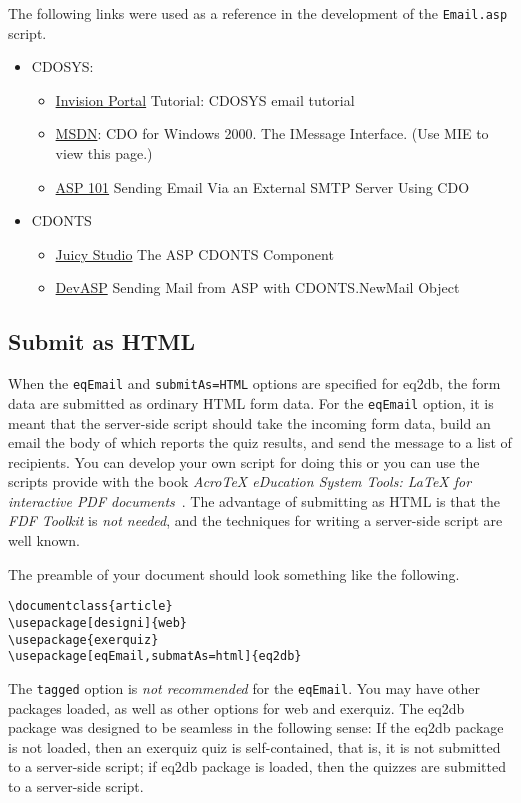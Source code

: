 \documentclass{article}
\def\AEBBook{\textsl{{Acro\!\TeX} eDucation System Tools: {\LaTeX} for interactive PDF documents}}
\let\pkg\textsf
\let\opt\texttt
\let\amtIndent\leftmargini
\begin{document}
The following links were used as a reference in the development of the
\texttt{Email.asp} script.
\begin{itemize}
    \item CDOSYS:
    \begin{itemize}
        \item \href{http://invisionportal.com/show_tutorial.asp?TutorialID=160}{Invision Portal}  Tutorial: CDOSYS email tutorial
        \item \href{http://msdn.microsoft.com/library/default.asp?url=/library/en-us/cdosys/html/_cdosys_imessage_interface.asp}
                {MSDN}: CDO for Windows 2000. The IMessage Interface. (Use MIE to view this page.)
        \item \href{http://www.asp101.com/articles/john/cdosmtprelay/default.asp}{ASP 101} Sending Email Via an External SMTP Server Using CDO
    \end{itemize}
    \item CDONTS
    \begin{itemize}
        \item \href{http://www.juicystudio.com/tutorial/asp/cdonts.html}{Juicy Studio} The ASP CDONTS Component
        \item \href{http://www.devasp.com/Samples/mail.asp}{DevASP} Sending Mail from ASP with CDONTS.NewMail Object
    \end{itemize}
\end{itemize}

\subsection{Submit as HTML}

When the \opt{eqEmail} and \opt{submitAs=HTML} options are specified for
\pkg{eq2db}, the form data are submitted as ordinary HTML form data. For the
\opt{eqEmail} option, it is meant that the server-side script should take the
incoming form data, build an email the body of which reports the quiz
results, and send the message to a list of recipients. You can develop your
own script for doing this or you can use the scripts provide with the book
\AEBBook~\cite{book:AEBB}. The advantage of submitting as HTML is that the \textsl{FDF
Toolkit} is \emph{not needed}, and the techniques for writing a server-side
script are well known.

The preamble of your document should look something like the following.
\begin{Verbatim}[xleftmargin=\amtIndent,fontsize=\small]
\documentclass{article}
\usepackage[designi]{web}
\usepackage{exerquiz}
\usepackage[eqEmail,submatAs=html]{eq2db}
\end{Verbatim}
The \opt{tagged} option is \emph{not recommended} for the \opt{eqEmail}. You
may have other packages loaded, as well as other options for \pkg{web} and
\pkg{exerquiz}. The \pkg{eq2db} package was designed to be seamless in the
following sense: If the \pkg{eq2db} package is not loaded, then an
\pkg{exerquiz} quiz is self-contained, that is, it is not submitted to a
server-side script; if \pkg{eq2db} package is loaded, then the quizzes are
submitted to a server-side script.
\end{document}
